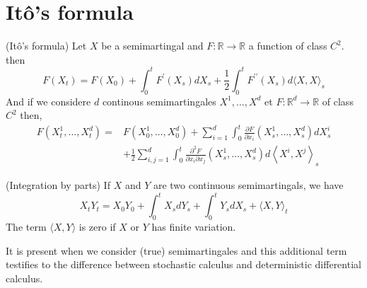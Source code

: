 \section{Itô's formula}
	\begin{theorem}
		(Itô's formula)
		Let $X$  be a semimartingal and $F: \mathbb{R} \rightarrow \mathbb{R}$ a function of class $C^{2} .$ then
		$$
		F\left(X_{t}\right)=F\left(X_{0}\right)+\int_{0}^{t} F^{\prime}\left(X_{s}\right) d X_{s}+\frac{1}{2} \int_{0}^{t} F^{\prime \prime}\left(X_{s}\right) d\langle X, X\rangle_{s}
		$$
		And if we considere $d$ continous semimartingales $X^{1}, \ldots, X^{d}$ et $F: \mathbb{R}^{d} \rightarrow \mathbb{R}$ of class $C^{2}$ then,
		$$
		\begin{aligned}
		F\left(X_{t}^{1}, \ldots, X_{t}^{d}\right)=& F\left(X_{0}^{1}, \ldots, X_{0}^{d}\right)+\sum_{i=1}^{d} \int_{0}^{t} \frac{\partial F}{\partial x_{i}}\left(X_{s}^{1}, \ldots, X_{s}^{d}\right) d X_{s}^{i} \\
		&+\frac{1}{2} \sum_{i, j=1}^{d} \int_{0}^{t} \frac{\partial^{2} F}{\partial x_{i} \partial x_{j}}\left(X_{s}^{1}, \ldots, X_{s}^{d}\right) d\left\langle X^{i}, X^{j}\right\rangle_{s}
		\end{aligned}
		$$
	\end{theorem}


	\begin{corollary}
		(Integration by parts) If $X$ and $Y$ are two continuous semimartingals, we have
		$$
		X_{t} Y_{t}=X_{0} Y_{0}+\int_{0}^{t} X_{s} d Y_{s}+\int_{0}^{t} Y_{s} d X_{s}+\langle X, Y\rangle_{t}
		$$
		The term $\langle X, Y\rangle$ is zero if $X$ or $Y$ has finite variation.
	\end{corollary}

	It is present when we consider (true) semimartingales and this additional term testifies to the difference between stochastic calculus and deterministic differential calculus.

